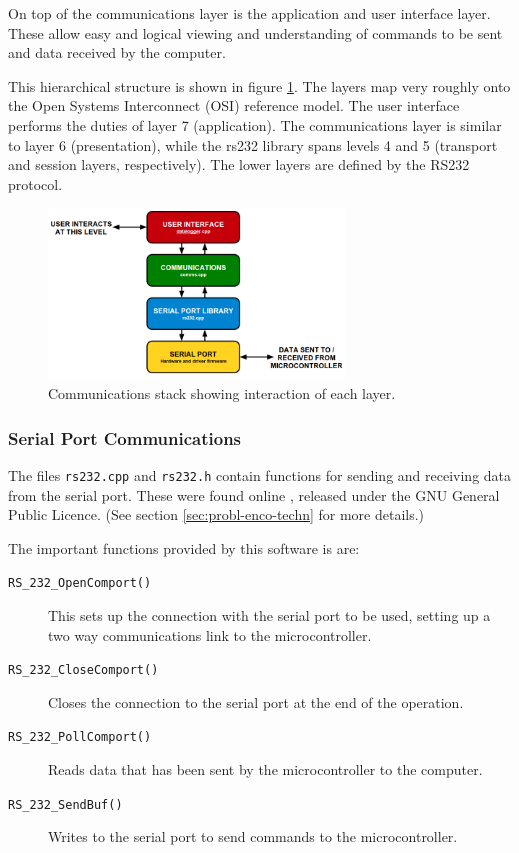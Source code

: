 \documentclass[a4paper,10pt]{article}  %
\begin{document}
On top of the communications layer is the application and user
interface layer. These allow easy and logical viewing and
understanding of commands to be sent and data received by the
computer.

This hierarchical structure is shown in figure
\ref{fig:commsprotocol}. The layers map very roughly onto the Open
Systems Interconnect (OSI) reference model. The user interface
performs the duties of layer 7 (application). The communications layer
is similar to layer 6 (presentation), while the rs232 library spans
levels 4 and 5 (transport and session layers, respectively). The lower
layers are defined by the RS232 protocol.

\begin{figure}[!htb]
  \begin{center}
    \includegraphics[width=0.7\textwidth]{CommunicationsProtocol.png}
  \end{center}
  \caption{Communications stack showing interaction of each layer.}
  \label{fig:commsprotocol}
\end{figure}

\subsubsection{Serial Port Communications}

The files \texttt{rs232.cpp} and \texttt{rs232.h} contain functions for
sending and receiving data from the serial port. These were found
online \cite{rs232_lib}, released under the GNU General Public
Licence. (See section \ref{sec:probl-enco-techn} for more details.)

The important functions provided by this software is are:
\begin{description}
  \item[\texttt{RS\_232\_OpenComport()}]
    This sets up the connection with the serial port to be used,
    setting up a two way communications link to the microcontroller.
  \item[\texttt{RS\_232\_CloseComport()}] Closes the connection to the
    serial port at the end of the operation.
  \item[\texttt{RS\_232\_PollComport()}] Reads data that has been sent
    by the microcontroller to the computer.
  \item[\texttt{RS\_232\_SendBuf()}] Writes to the serial port to send
    commands to the microcontroller.
\end{description}
\end{document}
